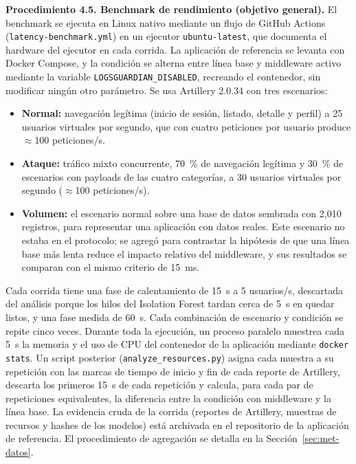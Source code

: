 \textbf{Procedimiento 4.5. Benchmark de rendimiento (objetivo general).} El benchmark se ejecuta
en Linux nativo mediante un flujo de GitHub Actions (\texttt{latency-benchmark.yml}) en un
ejecutor \texttt{ubuntu-latest}, que documenta el hardware del ejecutor en cada corrida. La
aplicación de referencia se levanta con Docker Compose, y la condición se alterna entre línea
base y middleware activo mediante la variable \texttt{LOGSGUARDIAN\_DISABLED}, recreando el
contenedor, sin modificar ningún otro parámetro. Se usa Artillery 2.0.34 \cite{artillerydocs}
con tres escenarios:

\begin{itemize}
    \item \textbf{Normal:} navegación legítima (inicio de sesión, listado, detalle y perfil) a
    25 usuarios virtuales por segundo, que con cuatro peticiones por usuario produce
    $\approx$100 peticiones/s.
    \item \textbf{Ataque:} tráfico mixto concurrente, 70~\% de navegación legítima y 30~\% de
    escenarios con payloads de las cuatro categorías, a 30 usuarios virtuales por segundo
    ($\approx$100 peticiones/s).
    \item \textbf{Volumen:} el escenario normal sobre una base de datos sembrada con 2{,}010
    registros, para representar una aplicación con datos reales. Este escenario no estaba en el
    protocolo; se agregó para contrastar la hipótesis de que una línea base más lenta reduce el
    impacto relativo del middleware, y sus resultados se comparan con el mismo criterio de 15~ms.
\end{itemize}

Cada corrida tiene una fase de calentamiento de 15~s a 5 usuarios/s, descartada del análisis
porque los hilos del Isolation Forest tardan cerca de 5~s en quedar listos, y una fase medida de
60~s. Cada combinación de escenario y condición se repite cinco veces. Durante toda la ejecución,
un proceso paralelo muestrea cada 5~s la memoria y el uso de CPU del contenedor de la aplicación
mediante \texttt{docker stats}. Un script posterior (\texttt{analyze\_resources.py}) asigna cada
muestra a su repetición con las marcas de tiempo de inicio y fin de cada reporte de Artillery,
descarta los primeros 15~s de cada repetición y calcula, para cada par de repeticiones
equivalentes, la diferencia entre la condición con middleware y la línea base. La evidencia
cruda de la corrida (reportes de Artillery, muestras de recursos y hashes de los modelos) está
archivada en el repositorio de la aplicación de referencia. El procedimiento de agregación se
detalla en la Sección~\ref{sec:met-datos}.

